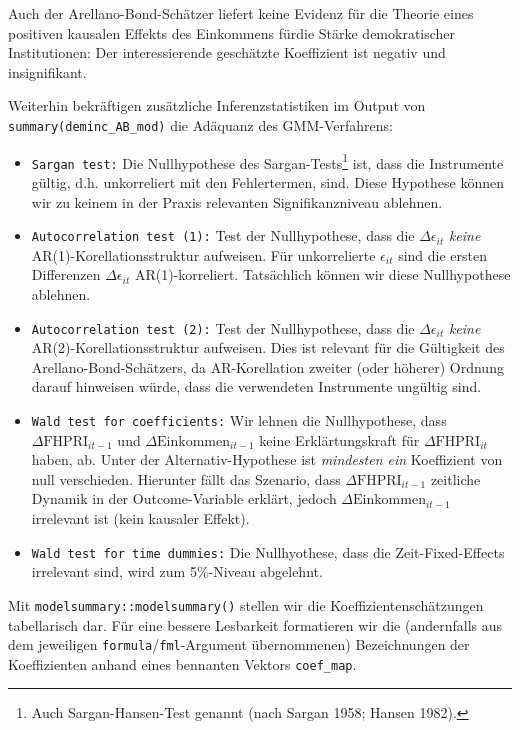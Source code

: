 \documentclass[
  a4paper,
  DIV=11,
  oneside]{scrreprt}
\begin{document}
Auch der Arellano-Bond-Schätzer liefert keine Evidenz für die Theorie
eines positiven kausalen Effekts des Einkommens fürdie Stärke
demokratischer Institutionen: Der interessierende geschätzte Koeffizient
ist negativ und insignifikant.

Weiterhin bekräftigen zusätzliche Inferenzstatistiken im Output von
\texttt{summary(deminc\_AB\_mod)} die Adäquanz des GMM-Verfahrens:

\begin{itemize}
\item
  \texttt{Sargan\ test:} Die Nullhypothese des Sargan-Tests\footnote{Auch
    Sargan-Hansen-Test genannt (nach Sargan 1958; Hansen 1982).} ist,
  dass die Instrumente gültig, d.h. unkorreliert mit den Fehlertermen,
  sind. Diese Hypothese können wir zu keinem in der Praxis relevanten
  Signifikanzniveau ablehnen.
\item
  \texttt{Autocorrelation\ test\ (1):} Test der Nullhypothese, dass die
  \(\Delta\epsilon_{it}\) \emph{keine} AR(1)-Korellationsstruktur
  aufweisen. Für unkorrelierte \(\epsilon_{it}\) sind die ersten
  Differenzen \(\Delta\epsilon_{it}\) AR(1)-korreliert. Tatsächlich
  können wir diese Nullhypothese ablehnen.
\item
  \texttt{Autocorrelation\ test\ (2):} Test der Nullhypothese, dass die
  \(\Delta\epsilon_{it}\) \emph{keine} AR(2)-Korellationsstruktur
  aufweisen. Dies ist relevant für die Gültigkeit des
  Arellano-Bond-Schätzers, da AR-Korellation zweiter (oder höherer)
  Ordnung darauf hinweisen würde, dass die verwendeten Instrumente
  ungültig sind.
\item
  \texttt{Wald\ test\ for\ coefficients:} Wir lehnen die Nullhypothese,
  dass \(\Delta\text{FHPRI}_{it-1}\) und
  \(\Delta\text{Einkommen}_{it-1}\) keine Erklärtungskraft für
  \(\Delta\text{FHPRI}_{it}\) haben, ab. Unter der Alternativ-Hypothese
  ist \emph{mindesten ein} Koeffizient von null verschieden. Hierunter
  fällt das Szenario, dass \(\Delta\text{FHPRI}_{it-1}\) zeitliche
  Dynamik in der Outcome-Variable erklärt, jedoch
  \(\Delta\text{Einkommen}_{it-1}\) irrelevant ist (kein kausaler
  Effekt).
\item
  \texttt{Wald\ test\ for\ time\ dummies:} Die Nullhyothese, dass die
  Zeit-Fixed-Effects irrelevant sind, wird zum 5\%-Niveau abgelehnt.
\end{itemize}

Mit \texttt{modelsummary::modelsummary()} stellen wir die
Koeffizientenschätzungen tabellarisch dar. Für eine bessere Lesbarkeit
formatieren wir die (andernfalls aus dem jeweiligen
\texttt{formula}/\texttt{fml}-Argument übernommenen) Bezeichnungen der
Koeffizienten anhand eines bennanten Vektors \texttt{coef\_map}.
\end{document}
